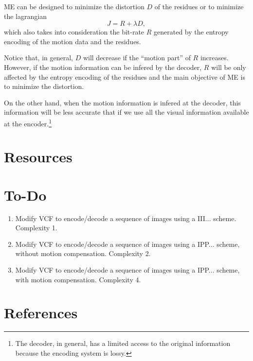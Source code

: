 ME can be designed to minimize the distortion $D$ of the residues or
to minimize the lagrangian
\begin{equation}
  J = R + \lambda D,
\end{equation}
which also takes into consideration the bit-rate $R$ generated by the
entropy encoding of the motion data and the residues.

Notice that, in general, $D$ will decrease if the ``motion part'' of
$R$ increases. However, if the motion information can be infered by
the decoder, $R$ will be only affected by the entropy encoding of the
residues and the main objective of ME is to minimize the distortion.

On the other hand, when the motion information is infered at the
decoder, this information will be less accurate that if we use all the
visual information available at the encoder.\footnote{The decoder, in
general, has a limited access to the original information because the
encoding system is lossy.}


\section{Resources}

\section{To-Do}

\begin{enumerate}
\item Modify VCF to encode/decode a sequence of images using a
  III... scheme. Complexity 1.
\item Modify VCF to encode/decode a sequence of images using a
  IPP... scheme, without motion compensation. Complexity 2.
\item Modify VCF to encode/decode a sequence of images using a
  IPP... scheme, with motion compensation. Complexity 4.
\end{enumerate}

  
\section{References}

\renewcommand{\addcontentsline}[3]{}%


